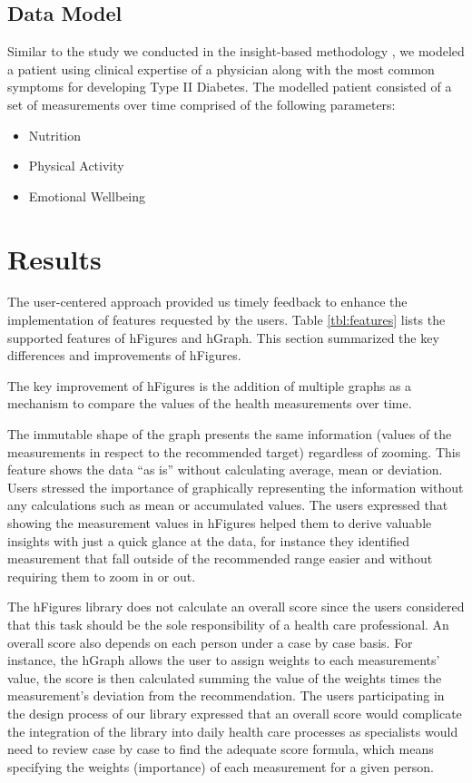 \documentclass[twocolumn]{bmcart}%
\begin{document}
\subsection*{Data Model}
Similar to the study we conducted in the insight-based methodology \citep{EMBCLedNiem}, we modeled a patient using clinical expertise of a physician along with the most common symptoms for developing Type II Diabetes. The modelled patient consisted of a set of measurements over time comprised of the following parameters:
\begin{itemize}
\item Nutrition
\item Physical Activity
\item Emotional Wellbeing
\end{itemize}


\section*{Results}

The user-centered approach provided us timely feedback to enhance the implementation of features requested by the users. Table \ref{tbl:features} lists the supported features of hFigures and hGraph. This section summarized the key differences and improvements of hFigures.

The key improvement of hFigures is the addition of multiple graphs as a mechanism to compare the values of the health measurements over time.

The immutable shape of the graph presents the same information (values of the measurements in respect to the recommended target) regardless of zooming. This feature shows the data ``as is'' without calculating average, mean or deviation. Users stressed the importance of graphically representing the information without any calculations such as mean or accumulated values. The users expressed that showing the measurement values in hFigures helped them to derive valuable insights with just a quick glance at the data, for instance they identified measurement that fall outside of the recommended range easier and without requiring them to zoom in or out.

The hFigures library does not calculate an overall score since the users considered that this task should be the sole responsibility of a health care professional. An overall score also depends on each person under a case by case basis. For instance, the hGraph allows the user to assign weights to each measurements' value, the score is then calculated summing the value of the weights times the measurement's deviation from the recommendation. The users participating in the design process of our library expressed that an overall score would complicate the integration of the library into daily health care processes as specialists would need to review case by case to find the adequate score formula, which means specifying the weights (importance) of each measurement for a given person.
\end{document}
